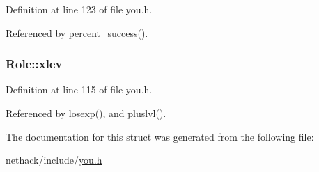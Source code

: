 Definition at line 123 of file you.\+h.



Referenced by percent\+\_\+success().

\hypertarget{structRole_a5628cbf5b1b658077beb6563cf3dd460}{
\subsubsection[{xlev}]{ Role\+::xlev}}\label{structRole_a5628cbf5b1b658077beb6563cf3dd460}


Definition at line 115 of file you.\+h.



Referenced by losexp(), and pluslvl().



The documentation for this struct was generated from the following file\+:\begin{DoxyCompactItemize}
\item 
nethack/include/\hyperlink{you_8h}{you.\+h}\end{DoxyCompactItemize}
